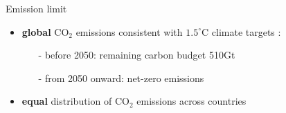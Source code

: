 \documentclass[11pt,aspectratio=169]{beamer}
\begin{document}
\addtocounter{framenumber}{-1}
\begin{frame}{Emission limit}
	\vspace{-1mm}
	\begin{itemize}
		\item  \textbf{global} CO$_2$ emissions consistent with $1.5^\circ$C climate targets \footnotesize{\citep{IPCC2022}}\normalsize :
		\vspace{1mm}
		\begin{itemize}
			\item[-] before 2050: remaining carbon budget 510Gt
			\item[-] from 2050 onward: net-zero  emissions
		\end{itemize}
		\vspace{0mm}
		\item \normalsize{\textbf{equal} distribution of  CO$_2$ emissions across countries }
	\end{itemize}
	\vspace{-2mm}
	

\end{frame}
\end{document}
